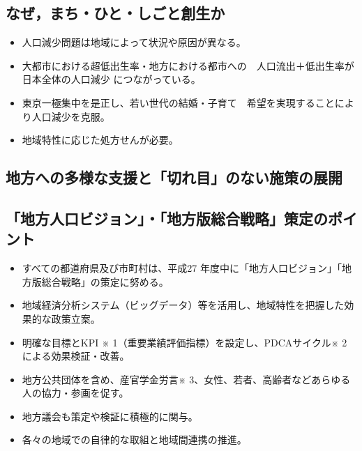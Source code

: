 \subsection {なぜ，まち・ひと・しごと創生か}
\begin {itemize}
\item 人口減少問題は地域によって状況や原因が異なる。
\item 大都市における超低出生率・地方における都市への　人口流出＋低出生率が日本全体の人口減少
  につながっている。
\item 東京一極集中を是正し、若い世代の結婚・子育て　希望を実現することにより人口減少を克服。
\item 地域特性に応じた処方せんが必要。

  \begin{figure}[htb]
    \begin{center}
    \end{center}
  \end{figure}

\end {itemize}

\subsection {地方への多様な支援と「切れ目」のない施策の展開}
\begin{figure}[htb]
  \begin{center}
  \end{center}
\end{figure}

\subsection {「地方人口ビジョン」・「地方版総合戦略」策定のポイント}
\begin {itemize}
\item すべての都道府県及び市町村は、平成27 年度中に「地方人口ビジョン」「地方版総合戦略」の策定に努める。
\item 地域経済分析システム（ビッグデータ）等を活用し、地域特性を把握した効果的な政策立案。
\item 明確な目標とKPI ※ 1（重要業績評価指標）を設定し、PDCAサイクル※ 2 による効果検証・改善。
\item 地方公共団体を含め、産官学金労言※ 3、女性、若者、高齢者などあらゆる人の協力・参画を促す。
\item 地方議会も策定や検証に積極的に関与。
\item 各々の地域での自律的な取組と地域間連携の推進。
\end {itemize}

